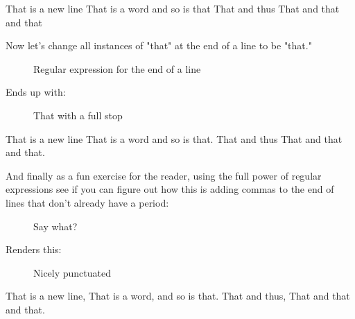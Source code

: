 \documentclass[10pt,american,]{book}
\newenvironment{Shaded}{\begin{snugshade}}{\end{snugshade}}
\newcommand{\KeywordTok}[1]{\textcolor[rgb]{0.13,0.29,0.53}{\textbf{{#1}}}}
\newcommand{\DataTypeTok}[1]{\textcolor[rgb]{0.13,0.29,0.53}{{#1}}}
\newcommand{\OtherTok}[1]{\textcolor[rgb]{0.56,0.35,0.01}{{#1}}}
\newcommand{\NormalTok}[1]{{#1}}
\numberwithin{figure}{chapter}
\DeclareRobustCommand{\drcap}[1]{\begin{figure}[H]\caption{#1}\end{figure}}
\renewcommand{\KeywordTok}[1]{{#1}}
\renewcommand{\DataTypeTok}[1]{{#1}}
\renewcommand{\OtherTok}[1]{{#1}}
\renewcommand{\NormalTok}[1]{{#1}}
\begin{document}
\begin{Shaded}
\begin{Highlighting}[]
\KeywordTok{That} \NormalTok{is a new line}
\KeywordTok{That} \NormalTok{is a word}
\KeywordTok{and} \NormalTok{so is that}
\KeywordTok{That} \NormalTok{and thus}
\KeywordTok{That} \NormalTok{and that and that}
\end{Highlighting}
\end{Shaded}

Now let's change all instances of "that" at the end of a line to be
"that."

\drcap{Regular expression for the end of a line}

\begin{Shaded}
\end{Shaded}

Ends up with:

\drcap{That with a full stop}

\begin{Shaded}
\begin{Highlighting}[]
\KeywordTok{That} \NormalTok{is a new line}
\KeywordTok{That} \NormalTok{is a word}
\KeywordTok{and} \NormalTok{so is that.}
\KeywordTok{That} \NormalTok{and thus}
\KeywordTok{That} \NormalTok{and that and that.}
\end{Highlighting}
\end{Shaded}

And finally as a fun exercise for the reader, using the full power of
regular expressions see if you can figure out how this is adding commas
to the end of lines that don't already have a period:

\drcap{Say what?}

\begin{Shaded}
\end{Shaded}

Renders this:

\drcap{Nicely punctuated}

\begin{Shaded}
\begin{Highlighting}[]
\KeywordTok{That} \NormalTok{is a new line,}
\KeywordTok{That} \NormalTok{is a word,}
\KeywordTok{and} \NormalTok{so is that.}
\KeywordTok{That} \NormalTok{and thus,}
\KeywordTok{That} \NormalTok{and that and that.}
\end{Highlighting}
\end{Shaded}
\end{document}
